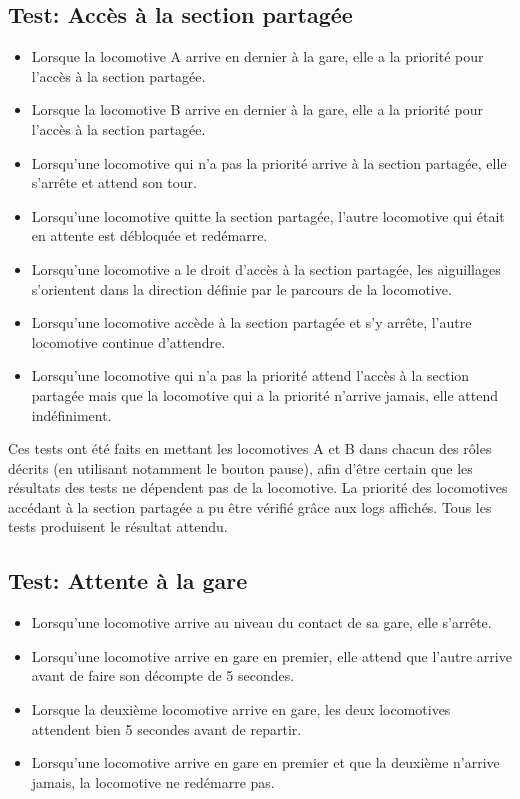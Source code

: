 \documentclass{article}
\begin{document}
\subsection*{Test: Accès à la section partagée}

\begin{itemize}
    
\item Lorsque la locomotive A arrive en dernier à la gare, elle a la priorité pour l'accès à la section partagée.
\item Lorsque la locomotive B arrive en dernier à la gare, elle a la priorité pour l'accès à la section partagée.
\item Lorsqu'une locomotive qui n'a pas la priorité arrive à la section partagée, elle s'arrête et attend son tour.
\item Lorsqu'une locomotive quitte la section partagée, l'autre locomotive qui était en attente est débloquée et redémarre.
\item Lorsqu'une locomotive a le droit d'accès à la section partagée, les aiguillages s'orientent dans la direction définie
par le parcours de la locomotive.
\item Lorsqu'une locomotive accède à la section partagée et s'y arrête, l'autre locomotive continue d'attendre. 
\item Lorsqu'une locomotive qui n'a pas la priorité attend l'accès à la section partagée mais que la locomotive qui a la 
priorité n'arrive jamais, elle attend indéfiniment.

\end{itemize}

Ces tests ont été faits en mettant les locomotives A et B dans chacun des rôles décrits  (en utilisant notamment le bouton pause), 
afin d'être certain que les résultats des tests ne dépendent pas de la locomotive. La priorité des locomotives accédant à la section 
partagée a pu être vérifié grâce aux logs affichés. Tous les tests produisent le résultat attendu.

\subsection*{Test: Attente à la gare}

\begin{itemize}
    
\item Lorsqu'une locomotive arrive au niveau du contact de sa gare, elle s'arrête.
\item Lorsqu'une locomotive arrive en gare en premier, elle attend que l'autre arrive avant de faire son décompte de 5 secondes.
\item Lorsque la deuxième locomotive arrive en gare, les deux locomotives attendent bien 5 secondes avant de repartir.
\item Lorsqu'une locomotive arrive en gare en premier et que la deuxième n'arrive jamais, la locomotive ne redémarre pas. 
    
\end{itemize}
\end{document}

